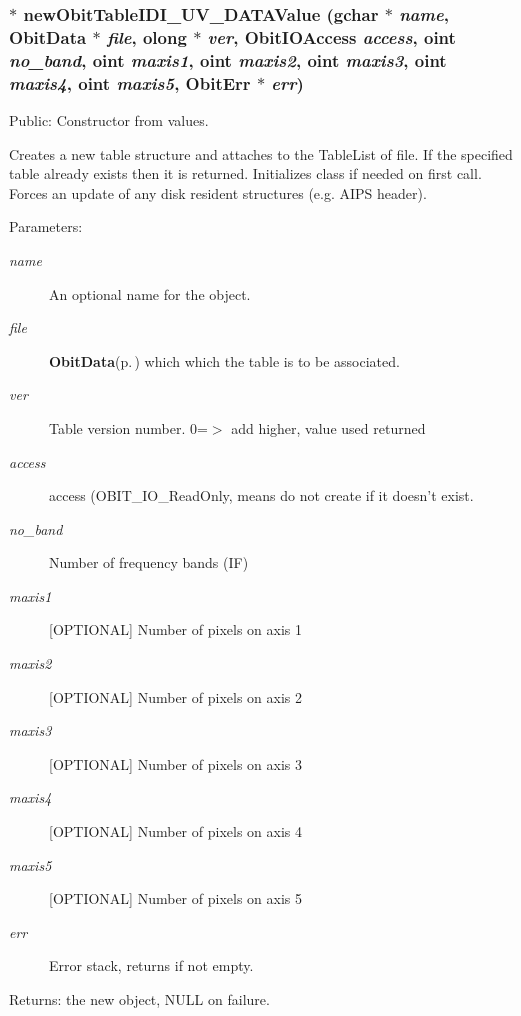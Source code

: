\subsubsection{$\ast$ new\-Obit\-Table\-IDI\_\-UV\_\-DATAValue (gchar $\ast$ {\em name}, {\bf Obit\-Data} $\ast$ {\em file}, {\bf olong} $\ast$ {\em ver}, Obit\-IOAccess {\em access}, {\bf oint} {\em no\_\-band}, {\bf oint} {\em maxis1}, {\bf oint} {\em maxis2}, {\bf oint} {\em maxis3}, {\bf oint} {\em maxis4}, {\bf oint} {\em maxis5}, {\bf Obit\-Err} $\ast$ {\em err})}\label{ObitTableIDI__UV__DATA_8h_a12}


Public: Constructor from values. 

Creates a new table structure and attaches to the Table\-List of file. If the specified table already exists then it is returned. Initializes class if needed on first call. Forces an update of any disk resident structures (e.g. AIPS header). \begin{Desc}
\item[Parameters:]
\begin{description}
\item[{\em name}]An optional name for the object. \item[{\em file}]{\bf Obit\-Data}{\rm (p.\,\pageref{structObitData})} which which the table is to be associated. \item[{\em ver}]Table version number. 0=$>$ add higher, value used returned \item[{\em access}]access (OBIT\_\-IO\_\-Read\-Only, means do not create if it doesn't exist. \item[{\em no\_\-band}]Number of frequency bands (IF) \item[{\em maxis1}][OPTIONAL] Number of pixels on axis 1 \item[{\em maxis2}][OPTIONAL] Number of pixels on axis 2 \item[{\em maxis3}][OPTIONAL] Number of pixels on axis 3 \item[{\em maxis4}][OPTIONAL] Number of pixels on axis 4 \item[{\em maxis5}][OPTIONAL] Number of pixels on axis 5 \item[{\em err}]Error stack, returns if not empty. \end{description}
\end{Desc}
\begin{Desc}
\item[Returns:]the new object, NULL on failure. \end{Desc}
